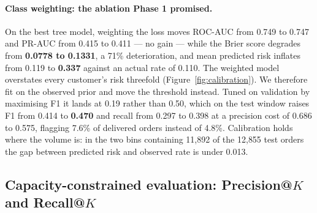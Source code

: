 \paragraph{Class weighting: the ablation Phase 1 promised.}
On the best tree model, weighting the loss moves ROC-AUC from 0.749 to 0.747 and
PR-AUC from 0.415 to 0.411 --- no gain --- while the Brier score degrades from
\textbf{0.0778 to 0.1331}, a 71\% deterioration, and mean predicted risk inflates
from 0.119 to \textbf{0.337} against an actual rate of 0.110. The weighted model
overstates every customer's risk threefold (Figure~\ref{fig:calibration}). We
therefore fit on the observed prior and move the threshold instead. Tuned on
validation by maximising F1 it lands at 0.19 rather than 0.50, which on the test
window raises F1 from 0.414 to \textbf{0.470} and recall from 0.297 to 0.398 at a
precision cost of 0.686 to 0.575, flagging 7.6\% of delivered orders instead of
4.8\%. Calibration holds where the volume is: in the two bins containing
11{,}892 of the 12{,}855 test orders the gap between predicted risk and observed
rate is under 0.013.

\subsection{Capacity-constrained evaluation: Precision@$K$ and Recall@$K$}
\label{sec:results-capacity}


